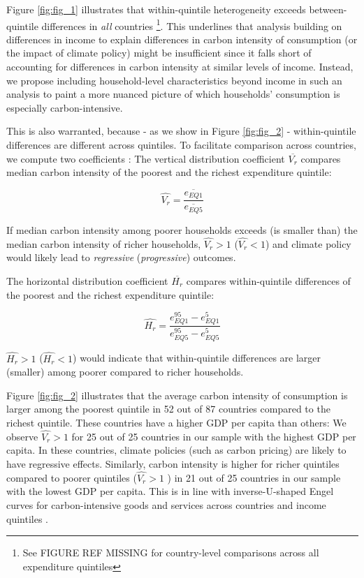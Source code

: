 \documentclass[12pt, a4paper]{article}
\begin{document}
Figure \ref{fig:fig_1} illustrates that within-quintile heterogeneity exceeds between-quintile differences in \textit{all} countries \footnote{See FIGURE REF MISSING for country-level comparisons across all expenditure quintiles}. This underlines that analysis building on differences in income to explain differences in carbon intensity of consumption (or the impact of climate policy) might be insufficient since it falls short of accounting for differences in carbon intensity at similar levels of income. Instead, we propose including household-level characteristics beyond income in such an analysis to paint a more nuanced picture of which households' consumption is especially carbon-intensive.

This is also warranted, because - as we show in Figure \ref{fig:fig_2} - within-quintile differences are different across quintiles. To facilitate comparison across countries, we compute two coefficients \autocite{Missbach.2023b}: The vertical distribution coefficient $\overline{V_{r}}$ compares median carbon intensity of the poorest and the richest expenditure quintile:

\begin{equation}
    \widehat{V_{r}} = \frac{\overline{e_{EQ1}}}{\overline{e_{EQ5}}}
\end{equation}

If median carbon intensity among poorer households exceeds (is smaller than) the median carbon intensity of richer households, $\widehat{V_{r}}>1$ ($\widehat{V_{r}}<1$) and climate policy would likely lead to \textit{regressive} (\textit{progressive}) outcomes.

The horizontal distribution coefficient $\overline{H_{r}}$ compares within-quintile differences of the poorest and the richest expenditure quintile:

\begin{equation}
    \widehat{H_{r}} = \frac{e_{EQ1}^{95} - e_{EQ1}^{5}}{e_{EQ5}^{95} - e_{EQ5}^{5}}
\end{equation}

$\widehat{H_{r}}>1$ ($\widehat{H_{r}}<1$) would indicate that within-quintile differences are larger (smaller) among poorer compared to richer households.

Figure \ref{fig:fig_2} illustrates that the average carbon intensity of consumption is larger among the poorest quintile in 52 out of 87 countries compared to the richest quintile. These countries have a higher GDP per capita than others: We observe $\widehat{V_{r}}>1$ for 25 out of 25 countries in our sample with the highest GDP per capita. In these countries, climate policies (such as carbon pricing) are likely to have regressive effects. Similarly, carbon intensity is higher for richer quintiles compared to poorer quintiles ($\widehat{V_{r}}>1$ ) in 21 out of 25 countries in our sample with the lowest GDP per capita. This is in line with inverse-U-shaped Engel curves for carbon-intensive goods and services across countries and income quintiles \autocite{Dorband.2019}. %
\end{document}
